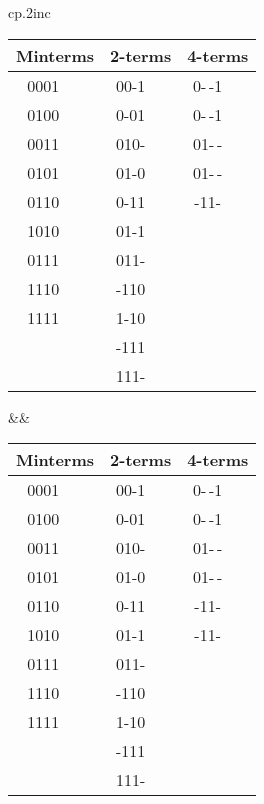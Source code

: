 \vspace{.1in}

\begin{tabular}{cp{.2in}c}
\begin{tabular}{cp{.1in}cp{.1in}cp{.1in}}
\multicolumn{2}{c}{Minterms} & \multicolumn{2}{c}{2-terms}  & \multicolumn{2}{c}{4-terms} \\\hline
0001 & \checkmark & 00-1 & \checkmark & 0-$\,$-1 &  \\
0100 & \checkmark & 0-01 & \checkmark & 0-$\,$-1 &  \\\cline{1-2}
0011 & \checkmark & 010- & \checkmark & 01-$\,$- &  \\
0101 & \checkmark & 01-0 & \checkmark & 01-$\,$- &  \\\cline{3-4}
0110 & \checkmark & 0-11 & \checkmark & \textcolor[rgb]{1.00,0.00,0.00}{-11-}     &  \\
1010 & \checkmark & 01-1 & \checkmark &  &  \\\cline{1-2}
0111 & \checkmark & \textcolor[rgb]{1.00,0.00,0.00}{011-} & \checkmark &  &  \\
1110 & \checkmark & -110 &            &  &  \\\cline{1-2}
1111 & \checkmark & 1-10 &            &  &  \\\cline{3-4}
     &            & -111 &            &  &  \\
     &            & \textcolor[rgb]{1.00,0.00,0.00}{111-} & \checkmark &  &  \\
\end{tabular}
&&
\begin{tabular}{cp{.1in}cp{.1in}cp{.1in}}
\multicolumn{2}{c}{Minterms} & \multicolumn{2}{c}{2-terms}  & \multicolumn{2}{c}{4-terms} \\\hline
0001 & \checkmark & 00-1 & \checkmark & 0-$\,$-1 &  \\
0100 & \checkmark & 0-01 & \checkmark & 0-$\,$-1 &  \\\cline{1-2}
0011 & \checkmark & 010- & \checkmark & 01-$\,$- &  \\
0101 & \checkmark & 01-0 & \checkmark & 01-$\,$- &  \\\cline{3-4}
0110 & \checkmark & 0-11 & \checkmark & -11-     &  \\
1010 & \checkmark & 01-1 & \checkmark & \textcolor[rgb]{1.00,0.00,0.00}{-11-}     &  \\\cline{1-2}
0111 & \checkmark & 011- & \checkmark &  &  \\
1110 & \checkmark & \textcolor[rgb]{1.00,0.00,0.00}{-110} & \checkmark &  &  \\\cline{1-2}
1111 & \checkmark & 1-10 &            &  &  \\\cline{3-4}
     &            & \textcolor[rgb]{1.00,0.00,0.00}{-111} & \checkmark &  &  \\
     &            & 111- & \checkmark &  &  \\
\end{tabular}\\
\end{tabular}

